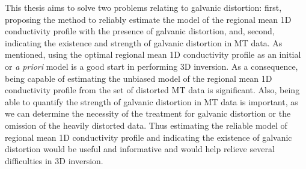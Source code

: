 


	This thesis aims to solve two problems relating to galvanic distortion: first, proposing the method to reliably estimate the model of the regional mean 1D conductivity profile with the presence of galvanic distortion, and, second, indicating the existence and strength of galvanic distortion in MT data. 
	As mentioned, using the optimal regional mean 1D conductivity profile as an initial or \emph{a priori} model is a good start in performing 3D inversion.
	As a consequence, being capable of estimating the unbiased model of the regional mean 1D conductivity profile from the set of distorted MT data is significant.
	Also, being able to quantify the strength of galvanic distortion in MT data is important, as we can determine the necessity of the treatment for galvanic distortion or the omission of the heavily distorted data.
	Thus estimating the reliable model of regional mean 1D conductivity profile and indicating the existence of galvanic distortion would be useful and informative and would help relieve several difficulties in  3D inversion.

